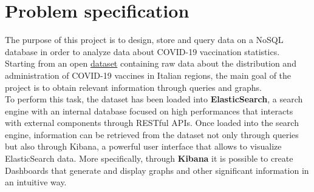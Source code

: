 \documentclass{article}
\begin{document}
\section{Problem specification}
The purpose of this project is to design, store and query data on a NoSQL database in order to analyze data about COVID-19 vaccination statistics.\\ Starting from an open \href{https://raw.githubusercontent.com/italia/covid19-opendata-vaccini/master/dati/somministrazioni-vaccini-latest.csv}{dataset} containing raw data about the distribution and administration of COVID-19 vaccines in Italian regions, the main goal of the project is to obtain relevant information through queries and graphs.\\
To perform this task, the dataset has been loaded into \textbf{ElasticSearch}, a search engine with an internal database focused on high performances that interacts with external components through RESTful APIs. Once loaded into the search engine, information can be retrieved from the dataset not only through queries but also through Kibana, a powerful user interface that allows to visualize ElasticSearch data. More specifically, through \textbf{Kibana} it is possible to create Dashboards that generate and display graphs and other significant information in an intuitive way.\\
\end{document}
